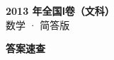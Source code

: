 \documentclass[zihao=-4, a4paper]{ctexart}
\begin{document}
\begin{center}
  {\Large\bfseries 2013 年全国Ⅰ卷（文科）}\\[4pt]
  {\large 数学 · 简答版}
\end{center}
\medskip
{}

\clearpage
{}
\begin{center}{\Large\bfseries 答案速查}\end{center}
\medskip

\end{document}
